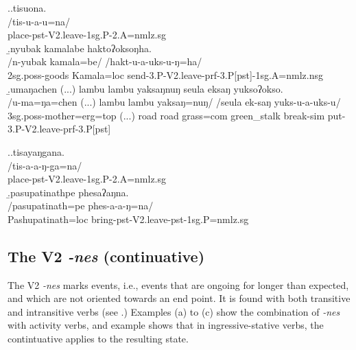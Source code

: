  \ex.\a.\glll tisuona.\\
 /tis-u-a-u=na/\\
 place{\sc -pst-V2.leave-1sg.P-2.A=nmlz.sg}\\
 \b.\glll nyubak kamalabe haktoʔoksoŋha.\\
 /n-yubak kamala=be/ /hakt-u-a-uks-u-ŋ=ha/\\
 {\sc 2sg.poss-}goods Kamala{\sc =loc} send{\sc -3.P-V2.leave-prf-3.P[pst]-1sg.A=nmlz.nsg}\\
 \b.\glll umaŋachen (...) lambu lambu yaksaŋnuŋ seula               eksaŋ         yuksoʔokso.\\
 /u-ma=ŋa=chen (...) lambu lambu yaksaŋ=nuŋ/ /seula               ek-saŋ         yuks-u-a-uks-u/\\
{\sc 3sg.poss-}mother{\sc =erg=top} (...) road road  grass{\sc =com} green\_stalk break{\sc -sim} put{\sc -3.P-V2.leave-prf-3.P[pst]}\\
   
 
 
 \ex.\a.\glll tisayaŋgana.\\
 /tis-a-a-ŋ-ga=na/\\
 place{\sc -pst-V2.leave-1sg.P-2.A=nmlz.sg}\\
 \b.\glll pasupatinathpe phesaʔaŋna.\\
 /pasupatinath=pe phes-a-a-ŋ=na/\\
Pashupatinath{\sc =loc} bring{\sc -pst-V2.leave-pst-1sg.P=nmlz.sg}\\



\subsection{The V2 \emph{-nes}  (continuative)}\label{V2-lay}%

The V2 \emph{-nes}  marks  events, i.e., events that are ongoing for longer than expected, and which are not oriented towards an end point. It is found with both transitive and intransitive verbs (see \Next.) Examples (a) to (c) show the combination of \emph{-nes} with activity verbs,  and example \Next[d] shows that in ingressive-stative verbs, the contintuative applies to the resulting state.
 
